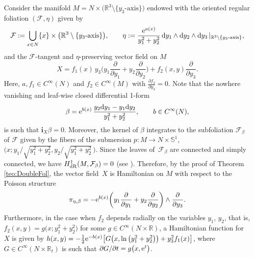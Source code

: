 \documentclass[10pt,a4paper]{amsart}
\newcommand{\R}[1]{\mathbb{R}^{#1}}
\newcommand{\dd}{{\rm d}}
\newcommand{\ii}{\mathbf{i}}
\numberwithin{equation}{section}
\begin{document}
\begin{Example}
Consider the manifold $M = N \times \big(\R{3} \setminus \{y_{3}\text{-axis}\}\big)$ endowed with the oriented regular foliation $(\mathcal{F}, \eta)$ given by
\[
\mathcal{F} := \bigcup_{x \in N}\{x\} \times \big(\R{3} \setminus \{y_{3}\text{-axis}\}\big), \qquad
\eta := \frac{{\rm e}^{a(x)}}{y_{1}^{2} + y_{2}^{2}}\, \dd{y_{1}} \wedge \dd{y_{2}} \wedge \dd{y_{3}}\,|_{\R{3} \setminus \{y_{3}\text{-axis}\}},
\]
and the $\mathcal{F}$-tangent and $\eta$-preserving vector field on $M$
 \begin{equation*}
 X = f_{1}(x)\, y_{3} \bigg( y_{1} \frac{\partial}{\partial y_{1}} + y_{2} \frac{\partial}{\partial y_{2}} \bigg) + f_{2}(x, y) \frac{\partial}{\partial y_{3}}.
 \end{equation*}
Here, $a, f_{1} \in C^{\infty}(N)$ and $f_{2} \in C^{\infty}(M)$ with $\frac{\partial f_{2}}{\partial y_{3}} = 0$. Note that the nowhere vanishing and leaf-wise closed differential 1-form
 \begin{equation*}
 \beta = {\rm e}^{b(x)}\,\frac{y_{2} \dd y_{1} - y_{1} \dd y_{2}}{y_{1}^2 + y_{2}^2}, \qquad b \in C^{\infty}(N),
 \end{equation*}
is such that $\ii_{X}\beta = 0$. Moreover, the kernel of $\beta$ integrates to the subfoliation $\mathcal{F}_{\beta}$ of $\mathcal{F}$ given by the fibers of the submersion $p\colon M \to N \times \mathbb{S}^{1}$, $\big( x; {y_{1}}/{\sqrt{y_{1}^{2} + y_{2}^{2}}}, {y_{2}}/{\sqrt{y_{1}^{2} + y_{2}^{2}}} \,\big)$.
Since the leaves of~$\mathcal{F}_{\beta}$ are connected and simply connected, we have $H^{1}_{{\rm dR}}(M, \mathcal{F}_{\beta}) = 0$ (see \cite[Proposition~7.4]{DazHec-91}). Therefore, by the proof of Theorem \ref{teo:DoubleFol}, the vector field~$X$ is Hamiltonian on $M$ with respect to the Poisson structure
 \begin{equation*}
 \pi_{\eta,\beta} = -{\rm e}^{b(x)}\bigg( y_{1}\frac{\partial}{\partial y_{1}} + y_{2}\frac{\partial}{\partial y_{2}} \bigg) \wedge \frac{\partial}{\partial y_{3}}.
 \end{equation*}
Furthermore, in the case when $f_{2}$ depends radially on the variables $y_1$, $y_2$, that is, $f_{2}(x,y) = g\big(x; y_{1}^{2} + y_{2}^{2}\big)$ for some $g\in C^{\infty}(N\times\mathbb{R})$, a Hamiltonian function for $X$ is given by $h(x,y) = -\frac{1}{2}{\rm e}^{-b(x)}\big[G\big(x,\ln\big(y_1^2+y_2^2\big)\big) + y_{3}^{2}f_{1}(x)\big]$, where $G\in C^{\infty}(N\times\mathbb{R}_{t})$ is such that ${\partial G}/{\partial t} = g\big(x,{\rm e}^{t}\big)$.
\end{Example}
\end{document}
